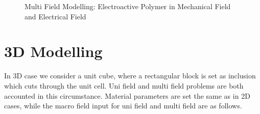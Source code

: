 \documentclass[10pt,a4paper]{scrreprt}
\begin{document}
\begin{figure}[htbp]
  \caption{Multi Field Modelling: Electroactive Polymer in Mechanical Field and Electrical Field}
\end{figure}

\newpage
\section{3D Modelling}
In 3D case we consider a unit cube, where a rectangular block is set as inclusion which cuts through the unit cell. Uni field and multi field problems are both accounted in this circumstance. Material parameters are set the same as in 2D cases, while the macro field input for uni field and multi field are as follows.
\end{document}
